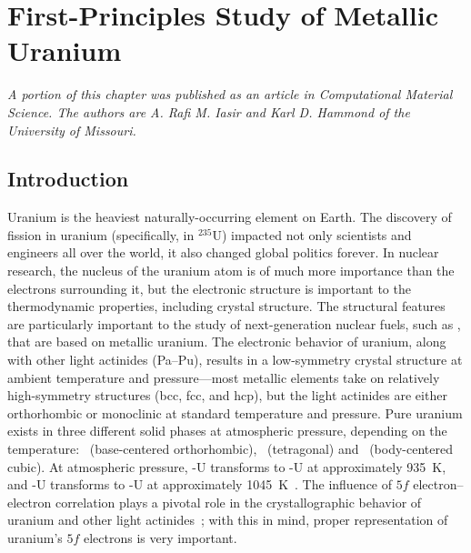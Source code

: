\chapter{First-Principles Study of Metallic Uranium}
\textit{A portion of this chapter was published as an article in Computational Material \mbox{Science}. The authors are A. Rafi M. Iasir and Karl D. Hammond of the University of Missouri.}


\section{Introduction}\label{sec_intro}
Uranium is the heaviest naturally-occurring element on Earth. The discovery of
fission in uranium (specifically, in $^{235}$U) impacted not only scientists
and engineers all over the world, it also changed global politics forever. In
nuclear research, the nucleus of the uranium atom is of much more importance
than the electrons surrounding it, but the electronic structure is important
to the thermodynamic properties, including crystal structure. The structural
features are particularly important to the study of next-generation nuclear
fuels, such as , that are based on metallic uranium.
The electronic behavior of uranium, along with other light actinides (Pa--Pu),
results in a low-symmetry crystal structure at ambient temperature and
pressure---most metallic elements take on relatively high-symmetry structures
(bcc, fcc, and hcp), but the light actinides are either orthorhombic or
monoclinic at standard temperature and pressure.
Pure uranium exists in three different solid phases at atmospheric pressure,
depending on the temperature:
\textalpha\ (base-centered orthorhombic), \textbeta\ (tetragonal) and
\textgamma\ (body-centered cubic). At atmospheric pressure, \textalpha-U
transforms to \textbeta-U at approximately 935~K, and \textbeta-U transforms to
\textgamma-U at approximately
1045~K~\cite{lawson1988structure,akella1997structural}.
The influence of $5f$
electron--electron correlation plays a pivotal role in the crystallographic
behavior of uranium and other light
actinides~\cite{lander2003gh,freemanHandbook1984}; with this in mind, proper
representation of uranium's $5f$ electrons is very important.

